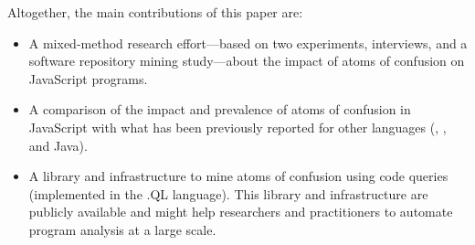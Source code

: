 Altogether, the main contributions of this paper are:

\begin{itemize}
    
\item A mixed-method research effort---based on two experiments, interviews, and a software
  repository mining study---about the impact of atoms of confusion on JavaScript programs.

  \item A comparison of the impact and prevalence of atoms of confusion in
    JavaScript with what has been previously reported for other languages
    (\clang, \cpplang, and Java).
    \item A library and infrastructure to mine atoms of confusion using 
    code queries (implemented in the .QL language). This library and 
    infrastructure are publicly available and might help researchers and 
    practitioners to automate program analysis at a large scale.

\end{itemize}











